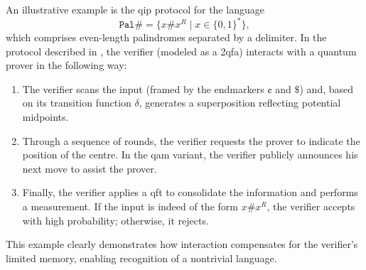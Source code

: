 \begin{example}
An illustrative example is the \gls{qip} protocol for the language
\[
\mathtt{Pal\#} = \{x\#x^R \mid x\in\{0,1\}^*\},
\]
which comprises even-length palindromes separated by a delimiter. In the protocol described in \cite{nishimura2015interactive}, the verifier (modeled as a 2qfa) interacts with a quantum prover in the following way:
\begin{enumerate}
  \item The verifier scans the input (framed by the endmarkers $\cent$ and $\$$) and, based on its transition function $\delta$, generates a superposition reflecting potential midpoints.
  \item Through a sequence of rounds, the verifier requests the prover to indicate the position of the centre. In the \gls{qam} variant, the verifier publicly announces his next move to assist the prover.
  \item Finally, the verifier applies a \gls{qft} to consolidate the information and performs a measurement. If the input is indeed of the form $x\#x^R$, the verifier accepts with high probability; otherwise, it rejects.
\end{enumerate}
This example clearly demonstrates how interaction compensates for the verifier's limited memory, enabling recognition of a nontrivial language.
\end{example}